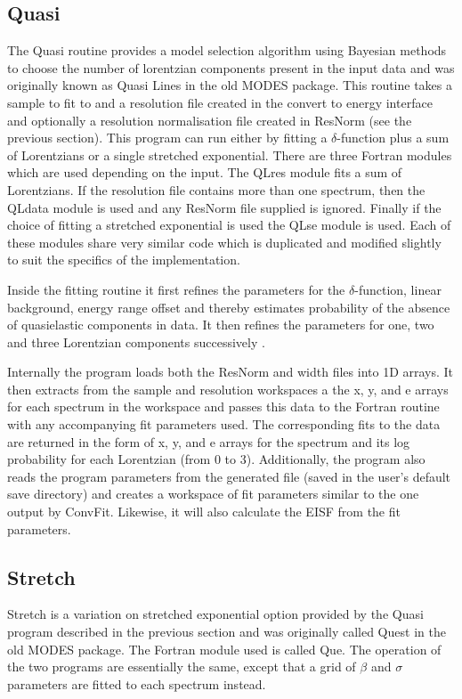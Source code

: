 \documentclass[paper=a4, fontsize=11pt]{scrartcl}	%
\numberwithin{equation}{section}															%
\numberwithin{figure}{section}																%
\numberwithin{table}{section}																%
\begin{document}
\subsection{Quasi}
The Quasi routine provides a model selection algorithm using Bayesian methods to choose the number of lorentzian components present in the input data \cite{dssivia1992} and was originally known as Quasi Lines in the old MODES package. This routine takes a sample to fit to and a resolution file created in the convert to energy interface and optionally a resolution normalisation file created in ResNorm (see the previous section). This program can run either by fitting a $\delta$-function plus a sum of Lorentzians or a single stretched exponential. There are three Fortran modules which are used depending on the input. The QLres module fits a sum of Lorentzians. If the resolution file contains more than one spectrum, then the QLdata module is used and any ResNorm file supplied is ignored. Finally if the choice of fitting a stretched exponential is used the QLse module is used. Each of these modules share very similar code which is duplicated and modified slightly to suit the specifics of the implementation.

Inside the fitting routine it first refines the parameters for the $\delta$-function, linear background, energy range offset and thereby estimates probability of the absence of quasielastic components in data. It then refines the parameters for one, two and three Lorentzian components successively \cite{dssivia1992}.

Internally the program loads both the ResNorm and width files into 1D arrays. It then extracts from the sample and resolution workspaces a the x, y, and e arrays for each spectrum in the workspace and passes this data to the Fortran routine with any accompanying fit parameters used. The corresponding fits to the data are returned in the form of x, y, and e arrays for the spectrum and its log probability for each Lorentzian (from 0 to 3). Additionally, the program also reads the program parameters from the generated file (saved in the user's default save directory) and creates a workspace of fit parameters similar to the one output by ConvFit. Likewise, it will also calculate the EISF from the fit parameters.

\subsection{Stretch}
\label{subsec:stretch}
Stretch is a variation on stretched exponential option provided by the Quasi program described in the previous section and was originally called Quest in the old MODES package. The Fortran module used is called Que. The operation of the two programs are essentially the same, except that a grid of $\beta$ and $\sigma$ parameters are fitted to each spectrum instead.
\end{document}
